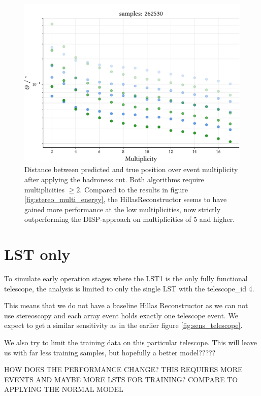 \begin{figure}
    \centering
    \captionsetup{width=0.9\linewidth}
    \includegraphics[width=0.9\linewidth]{../analysis/plots/gamma_cut/pairwise_median_100_vs_multi_comp.pdf}
    \caption{Distance between predicted and true position over event multiplicity after applying the hadroness cut. Both algorithms require
    multiplicities $\geq 2$. Compared to the results in figure \ref{fig:stereo_multi_energy}, 
    the HillasReconstructor seems to have gained more performance at the low multiplicities, now strictly outperforming the 
    DISP-approach on multiplicities of 5 and higher.}
    \label{fig:stereo_magic_multi_cut}
\end{figure}

\iffalse
\section{LST only}
To simulate early operation stages where the LST1 is the only fully functional 
telescope, the analysis is limited to only the single LST with 
the telescope\_id 4.

This means that we do not have a baseline Hillas Reconstructor as we can not use
stereoscopy and each array event holds exactly one telescope event.
We expect to
get a similar sensitivity as in the earlier figure \ref{fig:sens_telescope}.

We also try to limit the training data on this particular telescope.
This will leave us with far less training samples, but hopefully
a better model?????

HOW DOES THE PERFORMANCE CHANGE?
THIS REQUIRES MORE EVENTS AND MAYBE MORE LSTS FOR TRAINING?
COMPARE TO APPLYING THE NORMAL MODEL

